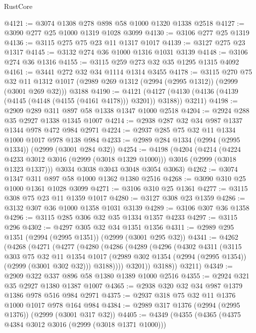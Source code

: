 \begin{lexlean}{RustCore}
\begin{coremodule}
@4121 := @3074 @1308 @278 @898 @58 @1000 @1320 @1338 @2518
@4127 := @3090 @277 @25 @1000 @1319 @1028 @3099
@4130 := @3106 @277 @25 @1319
@4136 := @3115 @275 @75 @23 @11 @1317 @1017
@4139 := @3127 @275 @23 @1317
@4145 := @3132 @274 @36 @1000 @1316 @1031 @3139
@4148 := @3106 @274 @36 @1316
@4155 := @3115 @259 @273 @32 @35 @1295 @1315 @4092
@4161 := @3441 @272 @32 @34 @1114 @1314 @3455
@4178 := @3115
    @270
    @75
    @32
    @11
    @1312
    @1017
    (@2989 @269 @1312 (@2994 (@2995 @1312)) (@2999 (@3001 @269 @32)))
    @3188
@4190 := @4121
    (@4127 (@4130 (@4136 (@4139 (@4145 (@4148 (@4155 (@4161 @4178))) @3201)) @3188)) @3211)
@4198 := @2909 @289 @311 @897 @58 @1338 @1347 @1000 @2518
@4204 := @2924 @288 @35 @2927 @1338 @1345 @1007
@4214 := @2938 @287 @32 @34 @987 @1337 @1344 @978 @472 @984 @2971
@4224 := @2937 @285 @75 @32 @11 @1334 @1000 @1017 @978 @138 @984
@4233 := @2989 @284 @1334 (@2994 (@2995 @1334)) (@2999 (@3001 @284 @32))
@4254 := @4198
    (@4204
      (@4214
        (@4224 @4233 @3012 @3016 (@2999 (@3018 @1329 @1000)))
        @3016
        (@2999 (@3018 @1323 @1337)))
      @3034
      @3038
      @3043
      @3048
      @3054
      @3063)
@4262 := @3074 @1347 @311 @897 @58 @1000 @1362 @1380 @2516
@4268 := @3090 @310 @25 @1000 @1361 @1028 @3099
@4271 := @3106 @310 @25 @1361
@4277 := @3115 @308 @75 @23 @11 @1359 @1017
@4280 := @3127 @308 @23 @1359
@4286 := @3132 @307 @36 @1000 @1358 @1031 @3139
@4289 := @3106 @307 @36 @1358
@4296 := @3115 @285 @306 @32 @35 @1334 @1357 @4233
@4297 := @3115 @296
@4302 := @4297 @305 @32 @34 @1351 @1356
@4311 := @2989 @295 @1351 (@2994 (@2995 @1351)) (@2999 (@3001 @295 @32))
@4341 := @4262
    (@4268
      (@4271
        (@4277
          (@4280
            (@4286
              (@4289
                (@4296
                  (@4302
                    @4311
                    (@3115
                      @303
                      @75
                      @32
                      @11
                      @1354
                      @1017
                      (@2989 @302 @1354 (@2994 (@2995 @1354)) (@2999 (@3001 @302 @32)))
                      @3188))))
              @3201))
          @3188))
      @3211)
@4349 := @2909 @322 @337 @896 @58 @1380 @1389 @1000 @2516
@4355 := @2924 @321 @35 @2927 @1380 @1387 @1007
@4365 := @2938 @320 @32 @34 @987 @1379 @1386 @978 @516 @984 @2971
@4375 := @2937 @318 @75 @32 @11 @1376 @1000 @1017 @978 @164 @984
@4384 := @2989 @317 @1376 (@2994 (@2995 @1376)) (@2999 (@3001 @317 @32))
@4405 := @4349
    (@4355
      (@4365
        (@4375 @4384 @3012 @3016 (@2999 (@3018 @1371 @1000)))

\end{coremodule}
\end{lexlean}
